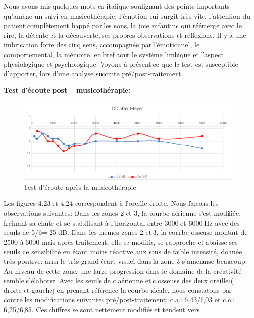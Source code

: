       Nous avons mis quelques mots en italique soulignant des  points
      importants qu'amène un suivi en musicothérapie: l'émotion qui surgit très
      vite,
      l'attention du patient complètement happé par les sons, la joie
      enfantine qui réémerge avec le rire, la détente et la découverte,
      ses propres observations et réflexions.
      Il y a une imbrication forte des cinq sens, accompagnée par l'émotionnel, le comportemental, la
      mémoire, en bref tout le système limbique et l'aspect
      physiologique et psychologique.
      Voyons à présent ce que le test est susceptible d'apporter, lors
      d'une analyse succinte pré/post-traitement.

\textbf{ Test d'écoute post -- musicothérapie:}
        
    	
 	
 	\begin{figure}[h]
 		\centering

 		\includegraphics[width=0.7\linewidth]{images/clinique/od_after_meyer.png}
 		\caption{Test d'écoute après la musicothérapie}
 		\label{fig:odaftermeyer}
 	\end{figure}
 Les figures 4.23 et 4.24 correspondent à l'oreille droite. 
        Nous faisons les observations suivantes:
      Dans les
        zones 2 et 3,  la courbe aérienne s'est modifiée, freinant sa
        chute et se stabilisant à l'horizontal entre 3000 et 6000 Hz
        avec des seuils de 5/6= 25 dB.
        Dans les mêmes zones 2 et 3, la
        courbe osseuse montait de 2500 à 6000 mais après traitement,
        elle se modifie, se rapproche et abaisse ses seuils de
        sensibilité en étant moins réactive aux sons de faible
        intensité, donnée très positive: ainsi le très grand écart visuel dans la zone 3 s'amenuise beaucoup. Au niveau de cette
        zone, une large progression dans
  le domaine de la créativité semble s'élaborer.
Avec les
  seuils 
   de c.aérienne et c.osseuse des deux oreilles( droite et gauche) en prenant
   référence la courbe idéale, nous
  constatons par contre les modifications suivantes pré/post-traitement:
  c.a.: 6,43/6,03 et c.o.: 6,25/6,85.
  Ces chiffres se sont nettement
  modifiés et tendent vers
